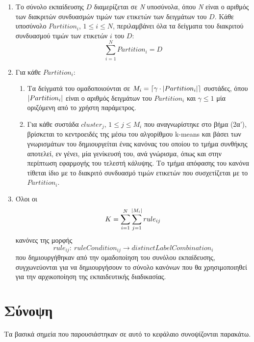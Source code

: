 \begin{enumerate}
\item Το σύνολο εκπαίδευσης $D$ διαμερίζεται σε \emph{N} υποσύνολα, όπου \emph{N} είναι ο αριθμός των διακριτών συνδυασμών τιμών των ετικετών των δειγμάτων του $D$. Κάθε υποσύνολο $Partition_{i}$, $1 \leq i \leq N$, περιλαμβάνει όλα τα δείγματα του διακριτού συνδυασμού τιμών των ετικετών $i$ του $D$: 
\begin{equation}
\sum\limits_{i=1}^N Partition_{i} = D
\end{equation}
\item Για κάθε $Partition_{i}$:

	\begin{enumerate}
	\item Τα δείγματά του ομαδοποιούνται σε $M_{i} = \left\lceil\gamma \cdot \lvert Partition_{i}\rvert\right\rceil$ συστάδες, όπου $\lvert Partition_{i}\rvert$ είναι ο αριθμός δειγμάτων του $Partition_{i}$ και $\gamma \leq 1$ μία οριζόμενη από το χρήστη παράμετρος.
	\item Για κάθε συστάδα $cluster_{j}$, $1\leq j \leq M_{i}$ που αναγνωρίστηκε στο βήμα (2α'), βρίσκεται το κεντροειδές της μέσω του αλγορίθμου k-means και βάσει των γνωρισμάτων του δημιουργείται ένας κανόνας του οποίου το τμήμα συνθήκης αποτελεί, εν γένει, μία γενίκευσή του, ανά γνώρισμα, όπως και στην περίπτωση εφαρμογής του τελεστή κάλυψης. Το τμήμα απόφασης του κανόνα τίθεται ίδιο με το διακριτό συνδυασμό τιμών ετικετών που συσχετίζεται με το $Partition_{i}$.
 	\end{enumerate}
	\item Όλοι οι $$K = \sum\limits_{i=1}^N \sum\limits_{j=1}^{\lvert M_{i}\rvert}rule_{ij}$$ κανόνες της μορφής
	\\
	 $$rule_{ij}: \: ruleCondition_{ij} \rightarrow distinctLabelCombination_{i}$$ που δημιουργήθηκαν από την ομαδοποίηση του συνόλου εκπαίδευσης, συγχωνεύονται για να δημιουργήσουν το σύνολο κανόνων που θα χρησιμοποιηθεί για την αρχικοποίηση της εκπαιδευτικής διαδικασίας.
\end{enumerate}

\section{Σύνοψη}
Τα βασικά σημεία που παρουσιάστηκαν σε αυτό το κεφάλαιο συνοψίζονται παρακάτω.

